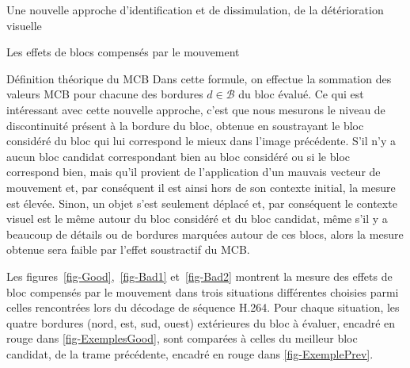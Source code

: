 \begin{chapter}{Une nouvelle approche d'identification et de dissimulation, de
la détérioration visuelle}
\begin{section}{Les effets de blocs compensés par le mouvement}
\begin{subsection}{Définition théorique du MCB}
Dans cette formule, on effectue la sommation des valeurs MCB pour chacune des
bordures $d \in \mathcal{B}$ du bloc évalué. Ce qui est intéressant avec cette
nouvelle approche, c'est que nous mesurons le niveau de discontinuité présent à
la bordure du bloc, obtenue en soustrayant le bloc considéré du bloc qui lui
correspond le mieux dans l'image précédente. S'il n'y a aucun bloc candidat
correspondant bien au bloc considéré ou si le bloc correspond bien, mais qu'il
provient de l'application d'un mauvais vecteur de mouvement et, par conséquent
il est ainsi hors de son contexte initial, la mesure est élevée. Sinon, un objet
s'est seulement déplacé et, par conséquent le contexte visuel est le même autour
du bloc considéré et du bloc candidat, même s'il y a beaucoup de détails ou de
bordures marquées autour de ces blocs, alors la mesure obtenue sera faible par
l'effet soustractif du MCB.

Les figures~\ref{fig-Good},~\ref{fig-Bad1} et~\ref{fig-Bad2} montrent la mesure
des effets de bloc compensés par le mouvement dans trois situations différentes
choisies parmi celles rencontrées lors du décodage de séquence H.264. Pour
chaque situation, les quatre bordures (nord, est, sud, ouest) extérieures du
bloc à évaluer, encadré en rouge dans \ref{fig-ExemplesGood}, sont comparées
à celles du meilleur bloc candidat, de la trame précédente, encadré en rouge
dans \ref{fig-ExemplePrev}.


\end{subsection}
\end{section}
\end{chapter}
